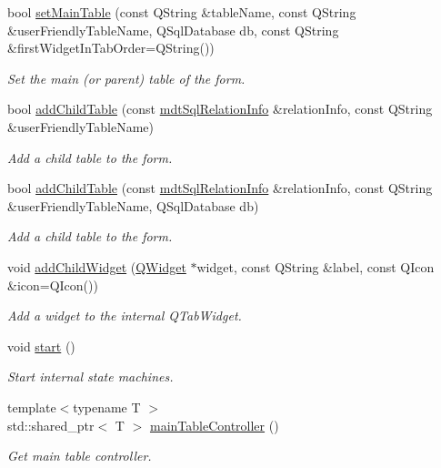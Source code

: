 \begin{DoxyCompactItemize}
bool \hyperlink{classmdt_sql_form_aee00ca6122b6a18a72b861e691fd035a}{set\-Main\-Table} (const Q\-String \&table\-Name, const Q\-String \&user\-Friendly\-Table\-Name, Q\-Sql\-Database db, const Q\-String \&first\-Widget\-In\-Tab\-Order=Q\-String())
\begin{DoxyCompactList}\small\item\em Set the main (or parent) table of the form. \end{DoxyCompactList}\item 
bool \hyperlink{classmdt_sql_form_a9c48a7af83effbc50e9171a8d7ff3889}{add\-Child\-Table} (const \hyperlink{classmdt_sql_relation_info}{mdt\-Sql\-Relation\-Info} \&relation\-Info, const Q\-String \&user\-Friendly\-Table\-Name)
\begin{DoxyCompactList}\small\item\em Add a child table to the form. \end{DoxyCompactList}\item 
bool \hyperlink{classmdt_sql_form_a0ffbb237eef4cb3b4e9b458860ef411d}{add\-Child\-Table} (const \hyperlink{classmdt_sql_relation_info}{mdt\-Sql\-Relation\-Info} \&relation\-Info, const Q\-String \&user\-Friendly\-Table\-Name, Q\-Sql\-Database db)
\begin{DoxyCompactList}\small\item\em Add a child table to the form. \end{DoxyCompactList}\item 
void \hyperlink{classmdt_sql_form_a86174e002c2dd5496ab74a7eb67c614c}{add\-Child\-Widget} (\hyperlink{class_q_widget}{Q\-Widget} $\ast$widget, const Q\-String \&label, const Q\-Icon \&icon=Q\-Icon())
\begin{DoxyCompactList}\small\item\em Add a widget to the internal Q\-Tab\-Widget. \end{DoxyCompactList}\item 
void \hyperlink{classmdt_sql_form_a101b73d24864dd208968ca6dfe5f8cd8}{start} ()
\begin{DoxyCompactList}\small\item\em Start internal state machines. \end{DoxyCompactList}\item 
{\footnotesize template$<$typename T $>$ }\\std\-::shared\-\_\-ptr$<$ T $>$ \hyperlink{classmdt_sql_form_ac32b24ebb2d203cbefb6c7bdb8d9867b}{main\-Table\-Controller} ()
\begin{DoxyCompactList}\small\item\em Get main table controller. \end{DoxyCompactList}\item 

\end{DoxyCompactItemize}
